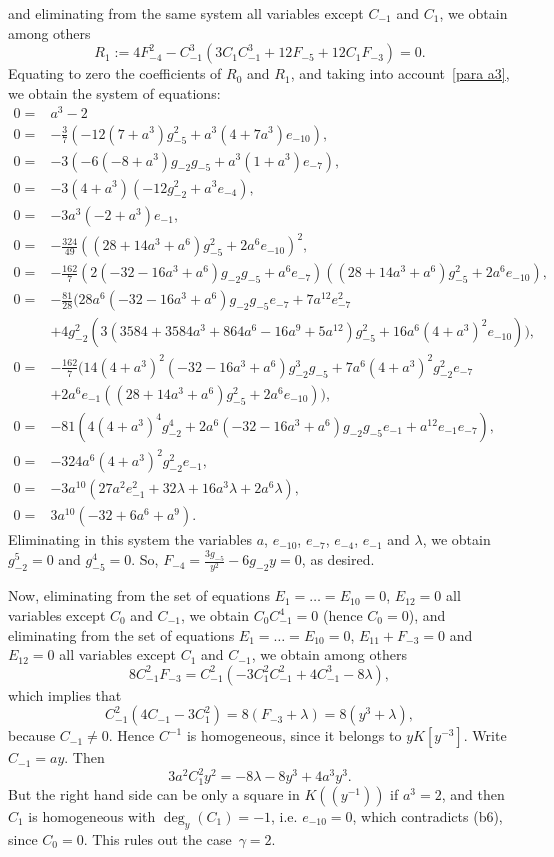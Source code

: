 \documentclass[reqno,a4paper]{amsart}
\theoremstyle{definition}
\theoremstyle{remark}
\begin{document}
and eliminating from the same system all variables except $C_{-1}$ and $C_{1}$, we obtain among others
$$
R_1 := 4 F_{-4}^2 - C_{-1}^3 (3 C_1 C_{-1}^3 + 12 F_{-5} + 12 C_1 F_{-3})=0.
$$
Equating to zero the coefficients of $R_0$ and $R_1$, and taking into
account~\eqref{para a3}, we obtain the system of equations:
\allowdisplaybreaks
\begin{align*}
0=& a^3-2\\
0=&-\frac 37 (-12 (7 + a^3) g_{-5}^2 + a^3 (4 + 7 a^3) e_{-10}),\\ 0 =&
-3 (-6 (-8 + a^3) g_{-2} g_{-5} + a^3 (1 + a^3) e_{-7}),\\ 0 =& -3 (4 + a^3) (-12 g_{-2}^2 + a^3 e_{-4}),\\
0 =& -3 a^3 (-2 + a^3) e_{-1},\\
0=& -\frac{324}{49} ((28 + 14 a^3 + a^6) g_{-5}^2 + 2 a^6 e_{-10})^2,\\
0 =& -\frac{162}{7} (2 (-32 - 16 a^3 + a^6) g_{-2} g_{-5} + a^6 e_{-7})
((28 + 14 a^3 + a^6) g_{-5}^2 + 2 a^6 e_{-10}), \\
0 =& -\frac{81}{28}(28 a^6 (-32 - 16 a^3 + a^6) g_{-2} g_{-5} e_{-7} + 7 a^12 e_{-7}^2\\
& +4 g_{-2}^2 (3 (3584 + 3584 a^3 + 864 a^6 - 16 a^9 + 5 a^12) g_{-5}^2 + 16 a^6 (4 + a^3)^2 e_{-10})),\\
0 =& -\frac{162}{7} (14 (4 + a^3)^2 (-32 - 16 a^3 + a^6) g_{-2}^3 g_{-5} + 7 a^6 (4 + a^3)^2 g_{-2}^2 e_{-7} \\
&+2 a^6 e_{-1} ((28 + 14 a^3 + a^6) g_{-5}^2 + 2 a^6 e_{-10})),\\
0 =& -81 (4 (4 + a^3)^4 g_{-2}^4 + 2 a^6 (-32 - 16 a^3 + a^6) g_{-2} g_{-5} e_{-1}
+ a^{12} e_{-1} e_{-7}),\\ 0 =& -324 a^6 (4 + a^3)^2 g_{-2}^2 e_{-1},\\
0 =& -3 a^{10} (27 a^2 e_{-1}^2 + 32 \lambda + 16 a^3 \lambda + 2 a^6 \lambda),\\
0 =& 3 a^{10} (-32 + 6 a^6 + a^9).
\end{align*}
Eliminating in this system the variables $a$, $e_{-10}$, $e_{-7}$, $e_{-4}$, $e_{-1}$
and $\lambda$, we obtain $g_{-2}^5 = 0$ and $g_{-5}^4 = 0$. So, $F_{-4}=
\frac{3 g_{-5}}{y^2} - 6 g_{-2} y=0$, as desired.

Now, eliminating from the set of equations $E_1=\dots=E_{10}=0$, $E_{12}=0$ all variables
except $C_0$ and $C_{-1}$, we obtain $C_0 C_{-1}^4 = 0$  (hence $C_0=0$), and eliminating
from the set of equations $E_1=\dots=E_{10}=0$, $E_{11}+F_{-3}=0$ and $E_{12}=0$ all
variables except $C_1$ and $C_{-1}$, we obtain among others
$$
8 C_{-1}^2 F_{-3} = C_{-1}^2 (-3 C_1^2 C_{-1}^2 + 4 C_{-1}^3 - 8 \lambda),
$$
which implies that
$$
C_{-1}^2(4C_{-1} - 3C_1^2) = 8(F_{-3} + \lambda)=8(y^3 + \lambda),
$$
because $C_{-1}\ne 0$. Hence $C^{-1}$ is homogeneous, since it belongs to $yK[y^{-3}]$. Write $C_{-1}=ay$. Then
$$
3 a^2 C_1^2 y^2 = -8 \lambda - 8 y^3 + 4 a^3 y^3.
$$
But the right hand side can be only a square in $K((y^{-1}))$ if $a^3=2$, and then $C_1$
is homogeneous with $\deg_y(C_1)=-1$, i.e. $e_{-10}=0$, which contradicts (b6), since
$C_0=0$. This rules out the case~$\gamma=2$.
\end{document}
